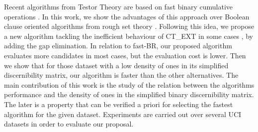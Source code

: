 \documentclass[authoryear,preprint,review,12pt]{elsarticle}
\begin{document}
  Recent algorithms from Testor Theory are based on fast binary cumulative operations \linebreak
  \citep{Sanchez10,Lias13}.
  In this work, we show the advantages of this approach over Boolean clause oriented algorithms from rough
  set theory \citep{WangP07,Jensen14}. Following this idea, we propose a new algorithm tackling the inefficient
  behaviour of CT\_EXT in some cases \citep{Alba14}, by adding the gap elimination. In relation to fast-BR, our 
  proposed algorithm evaluates more candidates in most cases, but the evaluation cost is lower. Then we show 
  that for those dataset with a low density of ones in its simplified discernibility matrix, our algorithm is 
  faster than the other alternatives. The main contribution of this work is the study of the relation between
  the algorithms performance and the density of ones in the simplified binary discernibility matrix. The later
  is a property that can be verified a priori for selecting the fastest algorithm for the given dataset.
  Experiments are carried out over several UCI datasets \citep{Bache13} in order to evaluate our proposal.
  
  
\end{document}
